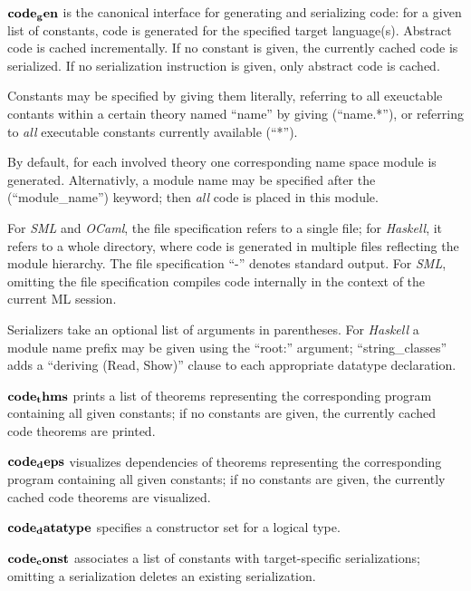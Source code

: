 \begin{descr}

\item [${\mathord{\mathbf{code_gen}}}$] is the canonical interface for generating and
  serializing code: for a given list of constants, code is generated for the specified
  target language(s).  Abstract code is cached incrementally.  If no constant is given,
  the currently cached code is serialized.  If no serialization instruction
  is given, only abstract code is cached.

  Constants may be specified by giving them literally, referring
  to all exeuctable contants within a certain theory named ``name''
  by giving (``name.*''), or referring to \emph{all} executable
  constants currently available (``*'').

  By default, for each involved theory one corresponding name space module
  is generated.  Alternativly, a module name may be specified after the
  (``module_name'') keyword; then \emph{all} code is placed in this module.

  For \emph{SML} and \emph{OCaml}, the file specification refers to
  a single file;  for \emph{Haskell}, it refers to a whole directory,
  where code is generated in multiple files reflecting the module hierarchy.
  The file specification ``-'' denotes standard output.  For \emph{SML},
  omitting the file specification compiles code internally
  in the context of the current ML session.

  Serializers take an optional list of arguments in parentheses. 
  For \emph{Haskell} a module name prefix may be given using the ``root:''
  argument;  ``string\_classes'' adds a ``deriving (Read, Show)'' clause
  to each appropriate datatype declaration.

\item [${\mathord{\mathbf{code_thms}}}$] prints a list of theorems representing the
  corresponding program containing all given constants; if no constants are
  given, the currently cached code theorems are printed.

\item [${\mathord{\mathbf{code_deps}}}$] visualizes dependencies of theorems representing the
  corresponding program containing all given constants; if no constants are
  given, the currently cached code theorems are visualized.

\item [${\mathord{\mathbf{code_datatype}}}$] specifies a constructor set for a logical type.

\item [${\mathord{\mathbf{code_const}}}$] associates a list of constants
  with target-specific serializations; omitting a serialization
  deletes an existing serialization.


\end{descr}
